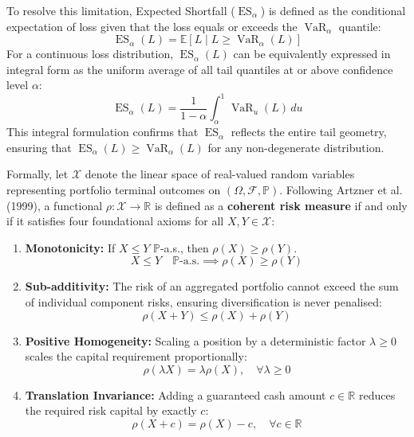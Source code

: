 \documentclass{article}
\theoremstyle{plain}
\theoremstyle{definition}
\theoremstyle{remark}
\DeclareMathOperator{\VaR}{VaR}
\DeclareMathOperator{\ES}{ES}
\begin{document}
To resolve this limitation, Expected Shortfall ($\ES_\alpha$) is defined as the conditional expectation of loss given that the loss equals or exceeds the $\VaR_\alpha$ quantile:
\begin{equation}
    \ES_\alpha(L) = \mathbb{E}[L \mid L \ge \VaR_\alpha(L)]
\end{equation}
For a continuous loss distribution, $\ES_\alpha(L)$ can be equivalently expressed in integral form as the uniform average of all tail quantiles at or above confidence level $\alpha$:
\begin{equation}
    \ES_\alpha(L) = \frac{1}{1 - \alpha} \int_\alpha^1 \VaR_u(L) \, du
\end{equation}
This integral formulation confirms that $\ES_\alpha$ reflects the entire tail geometry, ensuring that $\ES_\alpha(L) \ge \VaR_\alpha(L)$ for any non-degenerate distribution.

Formally, let $\mathcal{X}$ denote the linear space of real-valued random variables representing portfolio terminal outcomes on $(\Omega, \mathcal{F}, \mathbb{P})$. Following Artzner et al. (1999), a functional $\rho: \mathcal{X} \to \mathbb{R}$ is defined as a \textbf{coherent risk measure} if and only if it satisfies four foundational axioms for all $X, Y \in \mathcal{X}$:
\begin{enumerate}
    \item \textbf{Monotonicity:} If $X \le Y$ $\mathbb{P}$-a.s., then $\rho(X) \ge \rho(Y)$.
    \begin{equation}
        X \le Y \quad \mathbb{P}\text{-a.s.} \implies \rho(X) \ge \rho(Y)
    \end{equation}
    \item \textbf{Sub-additivity:} The risk of an aggregated portfolio cannot exceed the sum of individual component risks, ensuring diversification is never penalised:
    \begin{equation}
        \rho(X + Y) \le \rho(X) + \rho(Y)
    \end{equation}
    \item \textbf{Positive Homogeneity:} Scaling a position by a deterministic factor $\lambda \ge 0$ scales the capital requirement proportionally:
    \begin{equation}
        \rho(\lambda X) = \lambda \rho(X), \quad \forall \lambda \ge 0
    \end{equation}
    \item \textbf{Translation Invariance:} Adding a guaranteed cash amount $c \in \mathbb{R}$ reduces the required risk capital by exactly $c$:
    \begin{equation}
        \rho(X + c) = \rho(X) - c, \quad \forall c \in \mathbb{R}
    \end{equation}
\end{enumerate}
\end{document}
